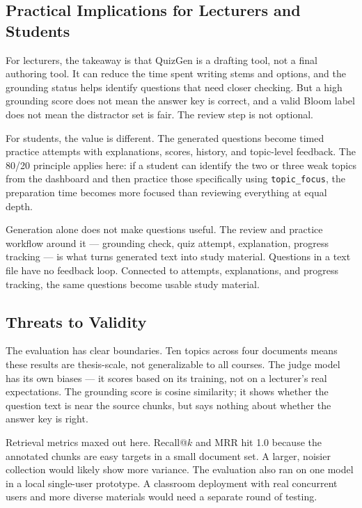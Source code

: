 \documentclass[12pt,a4paper]{article}
\begin{document}
\subsection{Practical Implications for Lecturers and Students}

For lecturers, the takeaway is that QuizGen is a drafting tool, not a final
authoring tool. It can reduce the time spent writing stems and options, and
the grounding status helps identify questions that need closer checking. But
a high grounding score does not mean the answer key is correct, and a valid
Bloom label does not mean the distractor set is fair. The review step is
not optional.

For students, the value is different. The generated questions become timed
practice attempts with explanations, scores, history, and topic-level
feedback. The 80/20 principle applies here: if a student can identify the
two or three weak topics from the dashboard and then practice those
specifically using \texttt{topic\_focus}, the preparation time becomes more
focused than reviewing everything at equal depth.

Generation alone does not make questions useful. The review and
practice workflow around it — grounding check, quiz attempt, explanation,
progress tracking — is what turns generated text into study material. Questions in a text file have no feedback loop. Connected to
attempts, explanations, and progress tracking, the same questions become
usable study material.

\subsection{Threats to Validity}

The evaluation has clear boundaries. Ten topics across four documents means
these results are thesis-scale, not generalizable to all courses. The judge
model has its own biases — it scores based on its training, not on a
lecturer's real expectations. The grounding score is cosine similarity; it
shows whether the question text is near the source chunks, but says nothing
about whether the answer key is right.

Retrieval metrics maxed out here. Recall@$k$ and MRR hit 1.0 because the
annotated chunks are easy targets in a small document set. A larger, noisier
collection would likely show more variance. The evaluation also ran on one
model in a local single-user prototype. A classroom deployment with real
concurrent users and more diverse materials would need a separate round of
testing.
\end{document}
